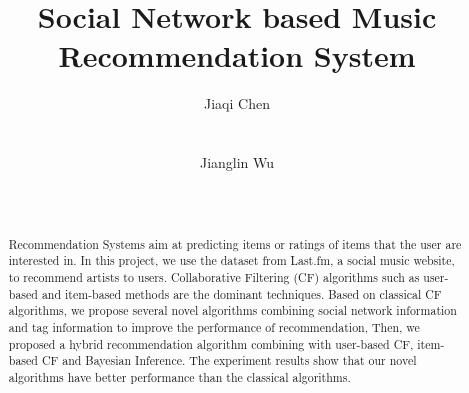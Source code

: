 \documentclass{sig-alternate}
\begin{document}
\title{Social Network based Music Recommendation System}

\author{
\alignauthor
Jiaqi Chen\\
       \\
       \\
\alignauthor
Jianglin Wu\\
       \\
       \\
}
\maketitle
\begin{abstract}
Recommendation Systems aim at predicting items or ratings of items that the user are interested in. In this project, we use the dataset from Last.fm, a social music website, to recommend artists to users. Collaborative Filtering (CF) algorithms such as user-based and item-based methods are the dominant techniques. Based on classical CF algorithms, we propose several novel algorithms combining social network information and tag information to improve the performance of recommendation, Then, we proposed a hybrid recommendation algorithm combining with user-based CF, item-based CF and Bayesian Inference. The experiment results show that our novel algorithms have better performance than the classical  algorithms.
\end{abstract}

\end{document}
